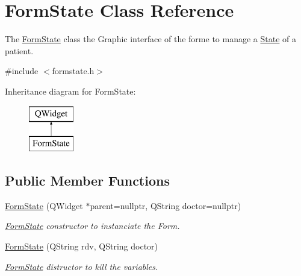 \hypertarget{class_form_state}{}\section{Form\+State Class Reference}
\label{class_form_state}


The \mbox{\hyperlink{class_form_state}{Form\+State}} class the Graphic interface of the forme to manage a \mbox{\hyperlink{class_state}{State}} of a patient.  




{\ttfamily \#include $<$formstate.\+h$>$}

Inheritance diagram for Form\+State\+:\begin{figure}[H]
\begin{center}
\leavevmode
\includegraphics[height=2.000000cm]{class_form_state}
\end{center}
\end{figure}
\subsection*{Public Member Functions}
\begin{DoxyCompactItemize}
\item 
\mbox{\hyperlink{class_form_state_a11287a7459c21ef2ec89b13f738855b0}{Form\+State}} (Q\+Widget $\ast$parent=nullptr, Q\+String doctor=nullptr)
\begin{DoxyCompactList}\small\item\em \mbox{\hyperlink{class_form_state}{Form\+State}} constructor to instanciate the Form. \end{DoxyCompactList}\item 
\mbox{\label{class_form_state_a4092de73e41e0664f78373e409754b48}} 
\mbox{\hyperlink{class_form_state_a4092de73e41e0664f78373e409754b48}{Form\+State}} (Q\+String rdv, Q\+String doctor)
\begin{DoxyCompactList}\small\item\em \mbox{\hyperlink{class_form_state}{Form\+State}} distructor to kill the variables. \end{DoxyCompactList}\end{DoxyCompactItemize}


